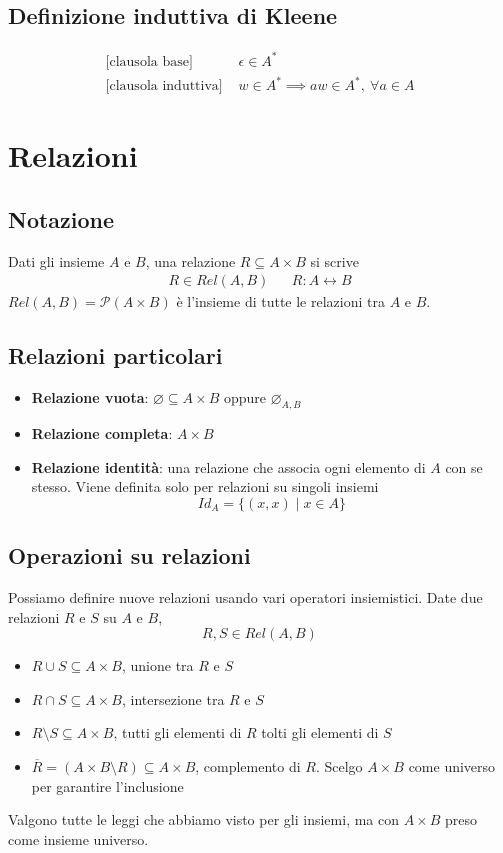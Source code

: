 \documentclass{article}
\begin{document}
\subsection*{Definizione induttiva di Kleene}
\begin{align*}
    \text{[clausola base] }      & \epsilon \in A^*                                \\
    \text{[clausola induttiva] } & w \in A^* \implies aw \in A^*,\ \forall a \in A
\end{align*}

\pagebreak

\section{Relazioni}
\subsection{Notazione}
Dati gli insieme \(A\) e \(B\), una relazione \(R \subseteq A \times B\) si scrive
\begin{align*}
    R \in Rel(A,B) &  & R: A \leftrightarrow B
\end{align*}
\(Rel(A,B) = \mathcal{P}(A \times B)\) è l'insieme di tutte le relazioni tra \(A\) e \(B\).
\subsection*{Relazioni particolari}
\begin{itemize}
    \item \textbf{Relazione vuota}: \(\varnothing \subseteq A \times B\) oppure \(\varnothing_{A,B}\)
    \item \textbf{Relazione completa}: \(A \times B\)
    \item \textbf{Relazione identità}: una relazione che associa ogni elemento di \(A\) con se stesso. Viene definita solo per relazioni su singoli insiemi
          \[Id_A = \{(x,x) \mid x \in A\}\]
\end{itemize}

\subsection{Operazioni su relazioni}
Possiamo definire nuove relazioni usando vari operatori insiemistici. Date due relazioni \(R\) e \(S\) su \(A\) e \(B\),
\[R, S \in Rel(A,B)\]
\begin{itemize}
    \item \(R \cup S \subseteq A \times B\), unione tra \(R\) e \(S\)
    \item \(R \cap S \subseteq A \times B\), intersezione tra \(R\) e \(S\)
    \item \(R \setminus S \subseteq A \times B\), tutti gli elementi di \(R\) tolti gli elementi di \(S\)
    \item \(\overline{R} = (A \times B \setminus R) \subseteq A \times B\), complemento di \(R\). Scelgo \(A \times B\) come universo per garantire l'inclusione
\end{itemize}
Valgono tutte le leggi che abbiamo visto per gli insiemi, ma con \(A \times B\) preso come insieme universo.
\end{document}

